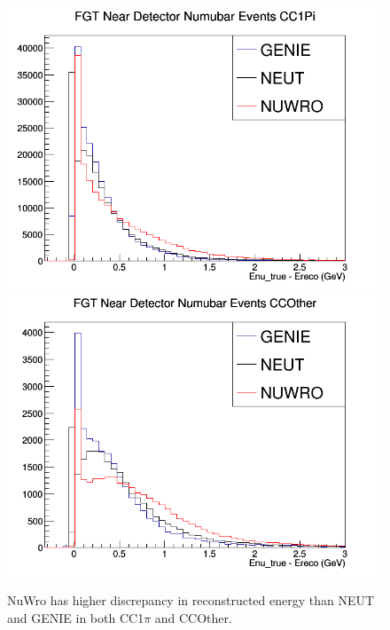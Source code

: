 \documentclass[12pt]{article}
\begin{document}
\begin{figure}[h]
\centering
{}
\includegraphics[width=\linewidth]{Ereco_Etrue/numubar_FGT_CC1Pi.png}
\endminipage
{}
\includegraphics[width=\linewidth]{Ereco_Etrue/numubar_FGT_CCOther.png}
\endminipage
\caption{NuWro has higher discrepancy in reconstructed energy than NEUT and GENIE in both CC1$\pi$ and CCOther.}
\label{fig:numubar_Etrue_ereco_FGT_CC1Pi_CCOther}
\end{figure}
\end{document}
